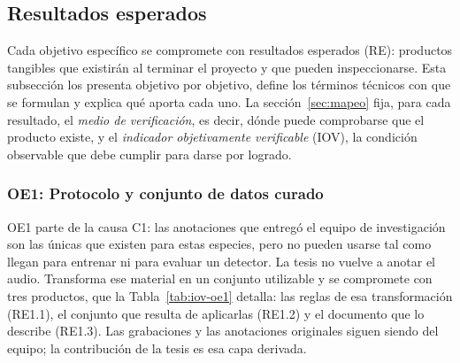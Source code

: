 \subsection{Resultados esperados}
\label{sec:resultados}

Cada objetivo específico se compromete con resultados esperados (RE): productos
tangibles que existirán al terminar el proyecto y que pueden inspeccionarse.
Esta subsección los presenta objetivo por objetivo, define los términos técnicos
con que se formulan y explica qué aporta cada uno. La
sección~\ref{sec:mapeo} fija, para cada resultado, el \emph{medio de
    verificación}, es decir, dónde puede comprobarse que el producto existe, y el
\emph{indicador objetivamente verificable} (IOV), la condición observable que
debe cumplir para darse por logrado.

\subsubsection{OE1: Protocolo y conjunto de datos curado}

OE1 parte de la causa C1: las anotaciones que entregó el equipo de investigación
son las únicas que existen para estas especies, pero no pueden usarse tal como
llegan para entrenar ni para evaluar un detector. La tesis no vuelve a anotar el
audio. Transforma ese material en un conjunto utilizable y se compromete con
tres productos, que la Tabla~\ref{tab:iov-oe1} detalla: las reglas de esa
transformación (RE1.1), el conjunto que resulta de aplicarlas (RE1.2) y el
documento que lo describe (RE1.3). Las grabaciones y las anotaciones originales
siguen siendo del equipo; la contribución de la tesis es esa capa derivada.

